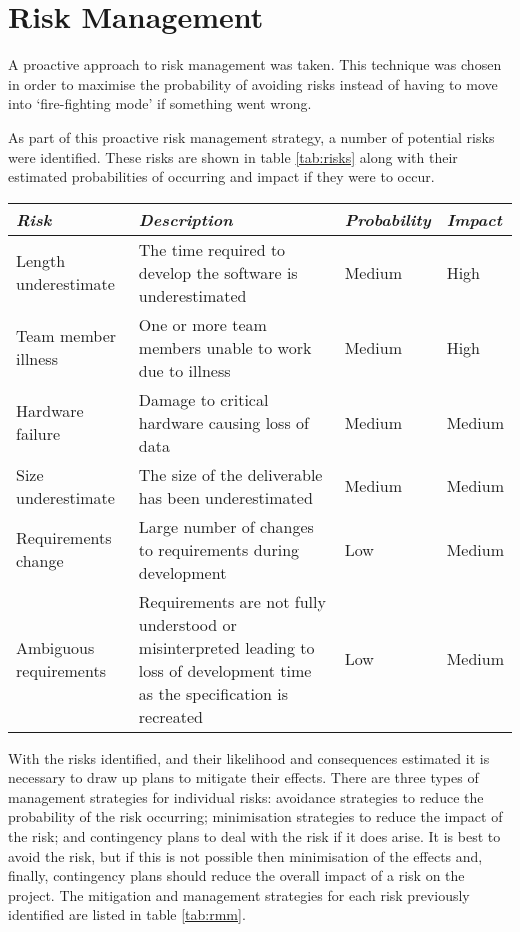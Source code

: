 \section{Risk Management}
\label{section:risk}
 
A proactive approach to risk management was taken. This technique was chosen in order
to maximise the probability of avoiding risks instead of having to move into `fire-fighting mode'
if something went wrong.
 
As part of this proactive risk management strategy, a number of potential risks were identified.
These risks are shown in table \ref{tab:risks} along with their estimated probabilities of occurring
and impact if they were to occur.
 
\begin{table*}
	\small
	\begin{tabular}{l p{} l l}
		\toprule
		\emph{Risk} & \emph{Description} & \emph{Probability} & \emph{Impact} \\
		\midrule
		Length underestimate & The time required to develop the software is underestimated & Medium & High \\
		Team member illness & One or more team members unable to work due to illness & Medium & High \\
		Hardware failure & Damage to critical hardware causing loss of data & Medium & Medium \\
		Size underestimate & The size of the deliverable has been underestimated & Medium & Medium \\
		Requirements change & Large number of changes to requirements during development & Low & Medium \\
		Ambiguous requirements & Requirements are not fully understood or misinterpreted leading to
			loss of development time as the specification is recreated & Low & Medium \\
		\bottomrule
	\end{tabular}
	\vspace{1.5em}
	\caption{Risk identification and analysis.}
	\label{tab:risks}
\end{table*}
 
With the risks identified, and their likelihood and consequences estimated it is necessary
to draw up plans to mitigate their effects. There are three types of management strategies 
for individual risks: avoidance strategies to reduce the probability of the risk occurring;
minimisation strategies to reduce the impact of the risk; and contingency plans to deal with
the risk if it does arise. It is best to avoid the risk,
but if this is not possible then minimisation of the effects and, finally, contingency plans
should reduce the overall impact of a risk on the project. The mitigation and management
strategies for each risk previously identified are listed in table \ref{tab:rmm}.
 
